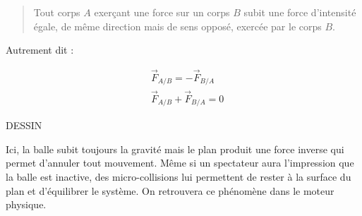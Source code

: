 \begin{quote}
Tout corps $A$ exerçant une force sur un corps $B$ subit une force d'intensité égale, de même direction mais de sens opposé, exercée par le corps $B$.
\end{quote}

Autrement dit :

\begin{align*}
  &\vec{F}_{A/B} = -\vec{F}_{B/A} \\
  &\vec{F}_{A/B} + \vec{F}_{B/A} = 0
\end{align*}

DESSIN

Ici, la balle subit toujours la gravité mais le plan produit une force inverse qui permet d'annuler tout mouvement. Même si un spectateur aura l'impression que la balle est inactive, des micro-collisions lui permettent de rester à la surface du plan et d'équilibrer le système. On retrouvera ce phénomène dans le moteur physique.
